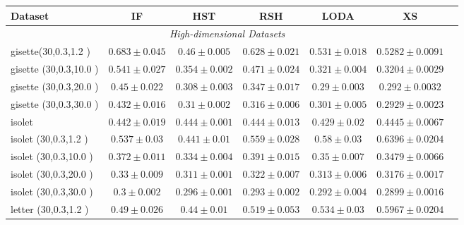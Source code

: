 \begin{footnotesize}
\begin{table}[p!]
		\begin{tabular}{lcccccc}
				\toprule
				\textbf{Dataset} & \textbf{IF} &  \textbf{HST} & \textbf{RSH} &  \textbf{LODA}  & \textbf{XS}\\
				\midrule
				\multicolumn{6}{c}{\textit{High-dimensional Datasets}}\\
gisette(30,0.3,1.2 )& $0.683 \pm 0.045$ &  $0.46 \pm 0.005$ &  $0.628 \pm 0.021$ &  $0.531 \pm 0.018$ &  $0.5282 \pm 0.0091$    \\
gisette (30,0.3,10.0 )& $0.541 \pm 0.027$ &  $0.354 \pm 0.002$ &  $0.471 \pm 0.024$ &  $0.321 \pm 0.004$ &  $0.3204 \pm 0.0029$    \\
gisette (30,0.3,20.0 )& $0.45 \pm 0.022$ &  $0.308 \pm 0.003$ &  $0.347 \pm 0.017$ &  $0.29 \pm 0.003$ &  $0.292 \pm 0.0032$    \\
gisette (30,0.3,30.0 )& $0.432 \pm 0.016$ &  $0.31 \pm 0.002$ &  $0.316 \pm 0.006$ &  $0.301 \pm 0.005$ &  $0.2929 \pm 0.0023$    \\
isolet& $0.442 \pm 0.019$ &  $0.444 \pm 0.001$ &  $0.444 \pm 0.013$ &  $0.429 \pm 0.02$ &  $0.4445 \pm 0.0067$    \\
\midrule
isolet (30,0.3,1.2 )& $0.537 \pm 0.03$ &  $0.441 \pm 0.01$ &  $0.559 \pm 0.028$ &  $0.58 \pm 0.03$ &  $0.6396 \pm 0.0204$    \\
isolet (30,0.3,10.0 )& $0.372 \pm 0.011$ &  $0.334 \pm 0.004$ &  $0.391 \pm 0.015$ &  $0.35 \pm 0.007$ &  $0.3479 \pm 0.0066$    \\
isolet (30,0.3,20.0 )& $0.33 \pm 0.009$ &  $0.311 \pm 0.001$ &  $0.322 \pm 0.007$ &  $0.313 \pm 0.006$ &  $0.3176 \pm 0.0017$    \\
isolet (30,0.3,30.0 )& $0.3 \pm 0.002$ &  $0.296 \pm 0.001$ &  $0.293 \pm 0.002$ &  $0.292 \pm 0.004$ &  $0.2899 \pm 0.0016$    \\
\midrule
letter (30,0.3,1.2 )& $0.49 \pm 0.026$ &  $0.44 \pm 0.01$ &  $0.519 \pm 0.053$ &  $0.534 \pm 0.03$ &  $0.5967 \pm 0.0204$    \\

\end{tabular}
\end{table}
\end{footnotesize}

